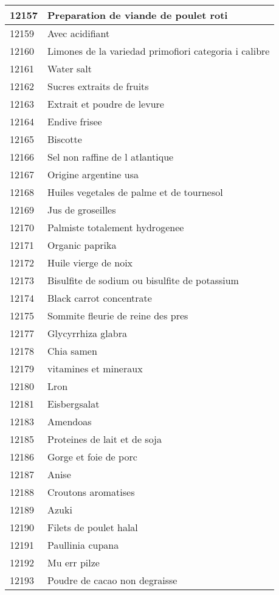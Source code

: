 \begin{longtable}{|l|l|}
12157 & Preparation de viande de poulet roti \\ \hline 
12159 & Avec acidifiant \\ \hline 
12160 & Limones de la variedad primofiori categoria i calibre \\ \hline 
12161 & Water salt \\ \hline 
12162 & Sucres extraits de fruits \\ \hline 
12163 & Extrait et poudre de levure \\ \hline 
12164 & Endive frisee \\ \hline 
12165 & Biscotte \\ \hline 
12166 & Sel non raffine de l atlantique \\ \hline 
12167 & Origine argentine usa \\ \hline 
12168 & Huiles vegetales de palme et de tournesol \\ \hline 
12169 & Jus de groseilles \\ \hline 
12170 & Palmiste totalement hydrogenee \\ \hline 
12171 & Organic paprika \\ \hline 
12172 & Huile vierge de noix \\ \hline 
12173 & Bisulfite de sodium ou bisulfite de potassium \\ \hline 
12174 & Black carrot concentrate \\ \hline 
12175 & Sommite fleurie de reine des pres \\ \hline 
12177 & Glycyrrhiza glabra \\ \hline 
12178 & Chia samen \\ \hline 
12179 & vitamines et mineraux \\ \hline 
12180 & Lron \\ \hline 
12181 & Eisbergsalat \\ \hline 
12183 & Amendoas \\ \hline 
12185 & Proteines de lait et de soja \\ \hline 
12186 & Gorge et foie de porc \\ \hline 
12187 & Anise \\ \hline 
12188 & Croutons aromatises \\ \hline 
12189 & Azuki \\ \hline 
12190 & Filets de poulet halal \\ \hline 
12191 & Paullinia cupana \\ \hline 
12192 & Mu err pilze \\ \hline 
12193 & Poudre de cacao non degraisse \\ \hline 

\end{longtable}
